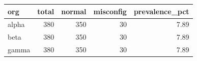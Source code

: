 \begin{tabular}{lrrrr}
\hline
org & total & normal & misconfig & prevalence\_pct \\
\hline
alpha & 380 & 350 & 30 & 7.89 \\
beta & 380 & 350 & 30 & 7.89 \\
gamma & 380 & 350 & 30 & 7.89 \\
\hline
\end{tabular}

